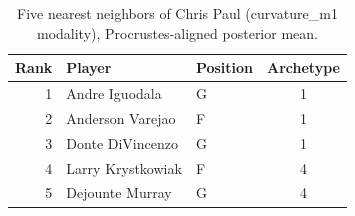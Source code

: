 \begin{table}[htbp]
  \centering\small
  \begin{tabular}{rllc}
    \toprule
    Rank & Player & Position & Archetype \\
    \midrule
    1 & Andre Iguodala & G & 1 \\
    2 & Anderson Varejao & F & 1 \\
    3 & Donte DiVincenzo & G & 1 \\
    4 & Larry Krystkowiak & F & 4 \\
    5 & Dejounte Murray & G & 4 \\
    \bottomrule
  \end{tabular}
  \caption{Five nearest neighbors of Chris Paul (curvature_m1 modality), Procrustes-aligned posterior mean.}
  \label{tab:Chris_Paul_neighbors_curvature_m1}
\end{table}

